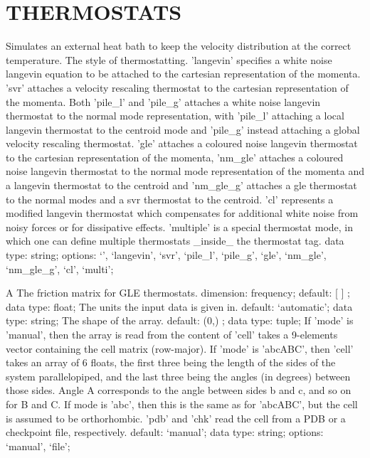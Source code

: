 \section{THERMOSTATS}
\label{THERMOSTATS}
\begin{ipifield}{}%
{Simulates an external heat bath to keep the velocity distribution at the correct temperature.}%
{}%
{%
{The style of thermostatting. 'langevin' specifies a white noise langevin equation to be attached to the cartesian representation of the momenta. 'svr' attaches a velocity rescaling thermostat to the cartesian representation of the momenta. Both 'pile\_l' and 'pile\_g' attaches a white noise langevin thermostat to the normal mode representation, with 'pile\_l' attaching a local langevin thermostat to the centroid mode and 'pile\_g' instead attaching a global velocity rescaling thermostat. 'gle' attaches a coloured noise langevin thermostat to the cartesian representation of the momenta, 'nm\_gle' attaches a coloured noise langevin thermostat to the normal mode representation of the momenta and a langevin thermostat to the centroid and 'nm\_gle\_g' attaches a gle thermostat to the normal modes and a svr thermostat to the centroid. 'cl' represents a modified langevin thermostat which compensates for additional white noise from noisy forces or for dissipative effects. 'multiple' is a special thermostat mode, in which one can define multiple thermostats \_inside\_ the thermostat tag.}%
{data type: string; options: `', `langevin', `svr', `pile\_l', `pile\_g', `gle', `nm\_gle', `nm\_gle\_g', `cl', `multi'; }%
}
\begin{ipifield}{A}%
{The friction matrix for GLE thermostats.}%
{dimension: frequency; default:  [ ] ; data type: float; }%
{%
{The units the input data is given in.}%
{default: `automatic'; data type: string; }%
%
{The shape of the array.}%
{default:  (0,) ; data type: tuple; }%
%
{If 'mode' is 'manual', then the array is read from the content of 'cell' takes a 9-elements vector containing the cell matrix (row-major). If 'mode' is 'abcABC', then 'cell' takes an array of 6 floats, the first three being the length of the sides of the system parallelopiped, and the last three being the angles (in degrees) between those sides. Angle A corresponds to the angle between sides b and c, and so on for B and C. If mode is 'abc', then this is the same as for 'abcABC', but the cell is assumed to be orthorhombic. 'pdb' and 'chk' read the cell from a PDB or a checkpoint file, respectively.}%
{default: `manual'; data type: string; options: `manual', `file'; }%
}
\end{ipifield}
\end{ipifield}
